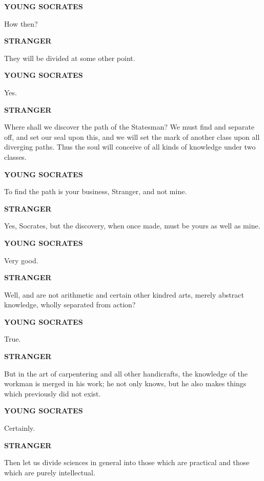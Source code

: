 \documentclass[11pt,letter]{article}
\begin{document}
\par \textbf{YOUNG SOCRATES}
\par   How then?

\par \textbf{STRANGER}
\par   They will be divided at some other point.

\par \textbf{YOUNG SOCRATES}
\par   Yes.

\par \textbf{STRANGER}
\par   Where shall we discover the path of the Statesman? We must find and separate off, and set our seal upon this, and we will set the mark of another class upon all diverging paths. Thus the soul will conceive of all kinds of knowledge under two classes.

\par \textbf{YOUNG SOCRATES}
\par   To find the path is your business, Stranger, and not mine.

\par \textbf{STRANGER}
\par   Yes, Socrates, but the discovery, when once made, must be yours as well as mine.

\par \textbf{YOUNG SOCRATES}
\par   Very good.

\par \textbf{STRANGER}
\par   Well, and are not arithmetic and certain other kindred arts, merely abstract knowledge, wholly separated from action?

\par \textbf{YOUNG SOCRATES}
\par   True.

\par \textbf{STRANGER}
\par   But in the art of carpentering and all other handicrafts, the knowledge of the workman is merged in his work; he not only knows, but he also makes things which previously did not exist.

\par \textbf{YOUNG SOCRATES}
\par   Certainly.

\par \textbf{STRANGER}
\par   Then let us divide sciences in general into those which are practical and those which are purely intellectual.
\end{document}

